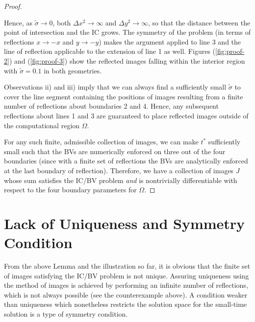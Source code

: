\documentclass[10pt]{article}
\begin{document}
\begin{proof}
\begin{enumerate}[i)]
    Hence, as $\tilde{\sigma} \to 0$, both $\Delta x^2 \to \infty$ and
    $\Delta y^2 \to \infty$, so that the distance between the point of
    intersection and the IC grows. The symmetry of the problem (in
    terms of reflections $x \to -x$ and $y \to -y$) makes the argument
    applied to line 3 and the line of reflection applicable to the
    extension of line 1 as well. Figures (\ref{fig:proof-2}) and
    (\ref{fig:proof-3}) show the reflected images falling within the
    interior region with $\tilde{\sigma} = 0.1$ in both geometries.
  \end{enumerate}
  Observations ii) and iii) imply that we can always find a
  sufficiently small $\tilde{\sigma}$ to cover the line segment
  containing the positions of images resulting from a finite number of
  reflections about boundaries 2 and 4.  Hence, any subsequent
  reflections about lines 1 and 3 are guaranteed to place reflected
  images outside of the computational region $\Omega$.

  For any such finite, admissible collection of images, we can make
  $t^*$ sufficiently small such that the BVs are numerically
  enforced on three out of the four boundaries (since with a finite
  set of reflections the BVs are analytically enforced at the last
  boundary of reflection). Therefore, we have a collection of images
  $J$ whose sum satisfies the IC/BV problem \textit{and} is
  nontrivially differentiable with respect to the four boundary
  parameters for $\Omega$.
\end{proof}

\section{Lack of Uniqueness and Symmetry Condition}
From the above Lemma and the illustration so far, it is obvious that
the finite set of images satisfying the IC/BV problem is not unique. Assuring
uniqueness using the method of images is achieved by performing an
infinite number of reflections, which is not always possible (see the
counterexample above). A condition weaker than uniqueness which
nonetheless restricts the solution space for the small-time solution
is a type of symmetry condition.
\end{document}
